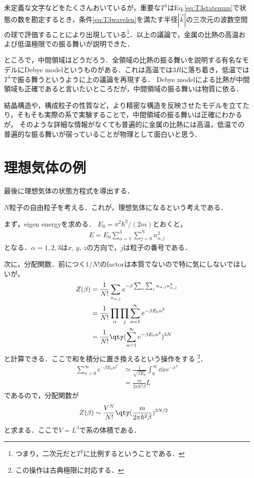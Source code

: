 	未定義な文字などをたくさんおいているが，重要な$T^3$はEq.\eqref{eq:T3statenum}で状態の数を勘定するとき，条件\eqref{eq:T3wavelen}を満たす半径$|\vec{k}|$の三次元の波数空間の球で評価することにより出現している\footnote{つまり，二次元だと$T^2$に比例するということである．}．以上の議論で，金属の比熱の高温および低温極限での振る舞いが説明できた．

	ところで，中間領域はどうだろう．全領域の比熱の振る舞いを説明する有名なモデルにDebye modelというものがある．これは高温では$3R$に落ち着き，低温では$T^3$で振る舞うというように上の議論を再現する．
	Debye modelによる比熱が中間領域も正確であると言いたいところだが，中間領域の振る舞いは物質に依る．

	結晶構造や，構成粒子の性質など，より精密な構造を反映させたモデルを立てたり，そもそも実際の系で実験することで，中間領域の振る舞いは正確にわかるが，
	そのような詳細な情報がなくても普遍的に金属の比熱には高温，低温での普遍的な振る舞いが宿っていることが物理として面白いと思う．

	\section{理想気体の例}\label{sec:ideal_gas}
	最後に理想気体の状態方程式を導出する．

	
	$N$粒子の自由粒子を考える．これが，理想気体になるという考えである．

	まず，eigen energyを求める． 
	$E_0 = \pi^2 \hbar^2 / (2m)$とおくと，
	\begin{align}
			E = E_0 \sum_{\alpha = 1}^{3}\sum_{j=0}^{N}n_{\alpha, j}^2
	\end{align}
	となる．$\alpha = 1, 2, 3$は$x$, $y$, $z$の方向で，$j$は粒子の番号である．

	次に，分配関数．前につく$1/N!$のfactorは本質でないので特に気にしないでほしいが，
	\begin{align}
			Z(\beta) 
			&= \frac{1}{N!}\sum_{n_{\alpha, j}}e^{-\beta \sum_{\alpha}\sum_{j}n_{\alpha, j}n_{\alpha, j}^2}\\
			&= \frac{1}{N!}\prod_{\alpha}\prod_{j}\sum_{n=1}^{\infty}e^{-\beta E_0 n^2}\\
			&= \frac{1}{N!}\qty(\sum_{n=1}^{\infty}e^{-\beta E_0 n^2})^{3N}
	\end{align}
	と計算できる．ここで和を積分に置き換えるという操作をする
	\footnote{
		この操作は古典極限に対応する．
	}．
	\begin{align}
			\sum_{n=0}^{\infty}e^{-\beta E_0 n^2} 
			&\simeq \frac{1}{\sqrt{\beta E_0}}\int_{0}^{\infty}\dd x e^{-x^2}\\
			&= \frac{m}{2\pi\hbar^2\beta}L
	\end{align}
	であるので，分配関数が
	\begin{align}
			Z(\beta)
			&\sim \frac{V^N}{N!}\qty(\frac{m}{2\pi\hbar^2\beta})^{3N/2}
	\end{align}
	と求まる．ここで$V=L^3$で系の体積である．

